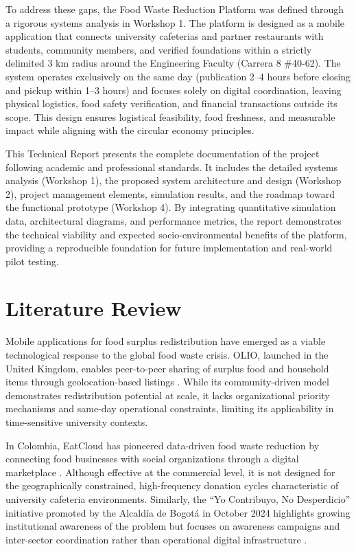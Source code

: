 \documentclass[conference]{IEEEtran}
\begin{document}
To address these gaps, the Food Waste Reduction Platform was defined through a rigorous systems analysis in Workshop 1. The platform is designed as a mobile application that connects university cafeterias and partner restaurants with students, community members, and verified foundations within a strictly delimited 3 km radius around the Engineering Faculty (Carrera 8 \#40-62). The system operates exclusively on the same day (publication 2--4 hours before closing and pickup within 1--3 hours) and focuses solely on digital coordination, leaving physical logistics, food safety verification, and financial transactions outside its scope. This design ensures logistical feasibility, food freshness, and measurable impact while aligning with the circular economy principles.

This Technical Report presents the complete documentation of the project following academic and professional standards. It includes the detailed systems analysis (Workshop 1), the proposed system architecture and design (Workshop 2), project management elements, simulation results, and the roadmap toward the functional prototype (Workshop 4). By integrating quantitative simulation data, architectural diagrams, and performance metrics, the report demonstrates the technical viability and expected socio-environmental benefits of the platform, providing a reproducible foundation for future implementation and real-world pilot testing.

\section{Literature Review}

Mobile applications for food surplus redistribution have emerged as a viable technological response to the global food waste crisis. OLIO, launched in the United Kingdom, enables peer-to-peer sharing of surplus food and household items through geolocation-based listings \cite{olio2024}. While its community-driven model demonstrates redistribution potential at scale, it lacks organizational priority mechanisms and same-day operational constraints, limiting its applicability in time-sensitive university contexts.

In Colombia, EatCloud has pioneered data-driven food waste reduction by connecting food businesses with social organizations through a digital marketplace \cite{eatcloud2025}. Although effective at the commercial level, it is not designed for the geographically constrained, high-frequency donation cycles characteristic of university cafeteria environments. Similarly, the ``Yo Contribuyo, No Desperdicio'' initiative promoted by the Alcaldía de Bogotá in October 2024 highlights growing institutional awareness of the problem but focuses on awareness campaigns and inter-sector coordination rather than operational digital infrastructure \cite{alcaldia2024}.
\end{document}
